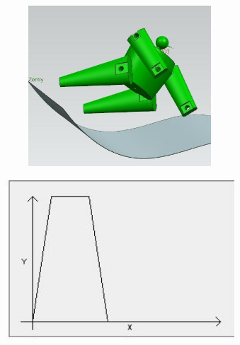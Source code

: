 \documentclass[12pt]{article}
\begin{document}
{\begin{figure}[H]
\begin{subfigure}{0.24\textwidth}
			\centering\includegraphics[height=6cm,width=1\textwidth,keepaspectratio]{var10_5.jpeg}
			\caption{}
			\label{fig:var10_5.jpeg}
		\end{subfigure}
		\begin{subfigure}{0.24\textwidth}
			\centering\includegraphics[height=6cm,width=1\textwidth,keepaspectratio]{var10_6.jpeg}
			\caption{}
			\label{fig:var10_6.jpeg}
		\end{subfigure}
	\end{figure}	
}
\end{document}
